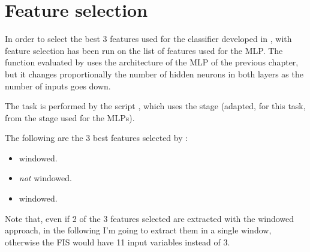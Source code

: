 \section{Feature selection}\label{sec:fuzzyfeatureselection}

In order to select the best 3 features used for the classifier developed in
,  with  feature
selection has been run on the list of features used for the MLP. The function
evaluated by  uses the architecture of the MLP of the
previous chapter, but it changes proportionally the number of hidden neurons in
both layers as the number of inputs goes down.

The task is performed by the script , which
uses the stage  (adapted, for this task, from the
 stage used for the MLPs).

The following are the 3 best features selected by :
\begin{itemize}
	\item {} windowed.
	\item {} \emph{not} windowed.
	\item {} windowed.
\end{itemize}

Note that, even if 2 of the 3 features selected are extracted with the windowed
approach, in the following I'm going to extract them in a single window,
otherwise the FIS would have 11 input variables instead of 3.
